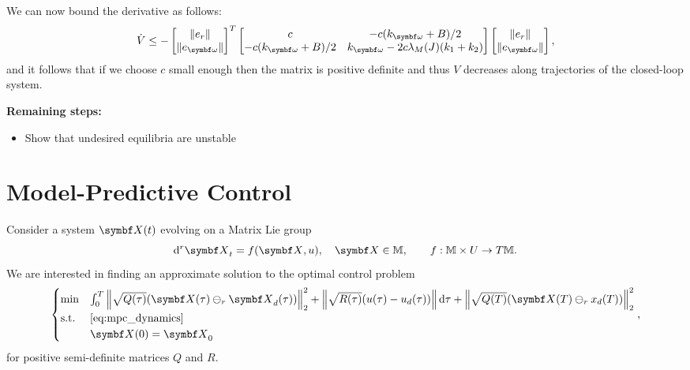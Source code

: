 \begin{tcolorbox}
  We can now bound the derivative as follows:
  \begin{equation}
    \dot V \leq
    - \begin{bmatrix}
      \| e_r \| \\ \| e_\bomega \|
    \end{bmatrix}^T
    \begin{bmatrix}
      c                   & -c(k_\bomega + B)/2                     \\
      -c(k_\bomega + B)/2 & k_\bomega - 2c \lambda_M(J) (k_1 + k_2)
    \end{bmatrix}
    \begin{bmatrix}
      \| e_r \| \\ \| e_\bomega \|
    \end{bmatrix},
  \end{equation}
  and it follows that if we choose $c$ small enough then the matrix is positive definite and thus $V$ decreases along trajectories of the closed-loop system.
\end{tcolorbox}

\textbf{Remaining steps:}

\begin{itemize}
  \item Show that undesired equilibria are unstable
\end{itemize}


\section{Model-Predictive Control}

Consider a system $\X(t)$ evolving on a Matrix Lie group
\begin{equation}
  \label{eq:mpc_dynamics}
  \mathrm{d}^r \X_t = f(\X, u), \quad \X \in \M, \qquad f : \M \times U \rightarrow T \M.
\end{equation}
We are interested in finding an approximate solution to the optimal control problem
\begin{equation}
  \label{eq:mpc_ocp}
  \begin{cases}
    \min        & \int_0^T \left\| \sqrt{Q(\tau)} (\X(\tau) \ominus_r \X_d(\tau)) \right\|_2^2 + \left\| \sqrt{R(\tau)} (u(\tau) - u_d(\tau)) \right\| \mathrm{d} \tau + \left\| \sqrt{Q(T)} (\X(T) \ominus_r x_d(T)) \right\|_2^2 \\
    \text{s.t.} & \eqref{eq:mpc_dynamics}                                                                                                                                                                                          \\
                & \X(0) = \X_0
  \end{cases},
\end{equation}
for positive semi-definite matrices $Q$ and $R$.


